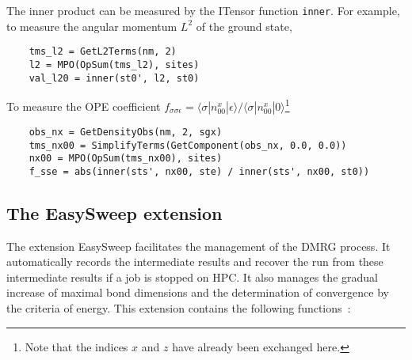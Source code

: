 \documentclass{timesjhep}
\begin{document}
The inner product can be measured by the ITensor function \lstinline|inner|. For example, to measure the angular momentum $L^2$ of the ground state,
\begin{lstlisting}
    tms_l2 = GetL2Terms(nm, 2)
    l2 = MPO(OpSum(tms_l2), sites)
    val_l20 = inner(st0', l2, st0)
\end{lstlisting}
To measure the OPE coefficient $f_{\sigma\sigma\epsilon}=\langle \sigma|n^x_{00}|\epsilon\rangle/\langle \sigma|n^x_{00}|0\rangle$\footnote{Note that the indices $x$ and $z$ have already been exchanged here.}
\begin{lstlisting}
    obs_nx = GetDensityObs(nm, 2, sgx)
    tms_nx00 = SimplifyTerms(GetComponent(obs_nx, 0.0, 0.0))
    nx00 = MPO(OpSum(tms_nx00), sites)
    f_sse = abs(inner(sts', nx00, ste) / inner(sts', nx00, st0))
\end{lstlisting}

\subsection{The EasySweep extension}

The extension EasySweep facilitates the management of the DMRG process. It automatically records the intermediate results and recover the run from these intermediate results if a job is stopped on HPC. It also manages the gradual increase of maximal bond dimensions and the determination of convergence by the criteria of energy. This extension contains the following functions~:
\end{document}
